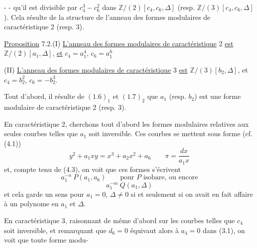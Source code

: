 -  -
qu'il est divisible par $c_4^3-c_6^2$ dans $\mathbb Z/(2)[c_4,c_6,\Delta]$ (resp. $\mathbb Z/(3)[c_4,c_6,\Delta]$). Cela résulte de la structure de l'anneau des formes modulaires de caractéristique 2 (resp. 3).

\uline{Proposition} 7.2.\quad(I) \uline{L'anneau des formes modulaires de caractéristique} 2 \uline{est} $\mathbb Z/(2)[a_1,\Delta]$, \uline{et} $c_4=a_1^4$, $c_6=a_1^6$

(II) \uline{L'anneau des formes modulaires de caractéristique} 3 \uline{est} $\mathbb Z/(3)[b_2,\Delta]$, et $c_4=b_2^2$, $c_6=-b_2^3$.

Tout d'abord, il résulte de $(1.6)_1$ et $(1.7)_2$ que $a_1$ (resp. $b_2$) est une forme modulaire de caractéristique 2 (resp. 3).

En caractéristique 2, cherchons tout d'abord les formes modulaires relatives aux seules courbes telles que $a_1$ soit inversible. Ces courbes se mettent sous forme (cf. (4.1))
\[
y^2+a_1xy=x^3+a_2x^2+a_6\qquad\pi=\frac{dx}{a_1x}
\]
et, compte tenu de (4.3), on voit que ces formes s'écrivent
\[
a_1^{-n}\ P(a_1,a_6)\qquad\text{pour }P\text{ isobare, ou encore}
\]
\[
a_1^{-m}\ Q(a_1,\Delta)
\]
et cela garde un sens pour $a_1=0$, $\Delta\ne0$ si et seulement si on avait en fait affaire à un polynome en $a_1$ et $\Delta$.

En caractéristique 3, raisonnant de même d'abord sur les courbes telles que $c_4$ soit inversible, et remarquant que $d_6=0$ équivaut alors à $a_4=0$ dans (3.1), on voit que toute forme modu-
